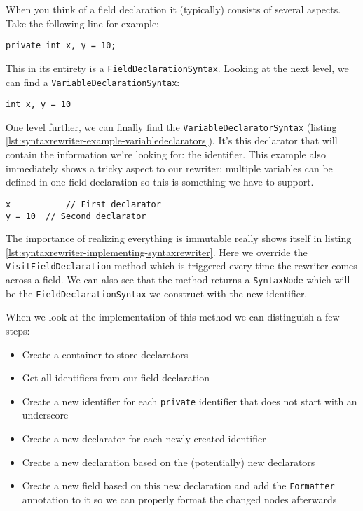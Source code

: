 When you think of a field declaration it (typically) consists of several aspects. Take the following line for example: 

\begin{lstlisting}[label={lst:syntaxrewriter-example-fielddeclaration}]
private int x, y = 10;
\end{lstlisting}

This in its entirety is a \texttt{FieldDeclarationSyntax}. Looking at the next level, we can find a \texttt{VariableDeclarationSyntax}:

\begin{lstlisting}[label={lst:syntaxrewriter-example-variabledeclaration}]
int x, y = 10
\end{lstlisting}

One level further, we can finally find the \texttt{VariableDeclaratorSyntax} (listing \ref{lst:syntaxrewriter-example-variabledeclarators}). It's this declarator that will contain the information we're looking for: the identifier. This example also immediately shows a tricky aspect to our rewriter: multiple variables can be defined in one field declaration so this is something we have to support.

\begin{lstlisting}[label={lst:syntaxrewriter-example-variabledeclarators}]
x 			// First declarator
y = 10 	// Second declarator
\end{lstlisting}

The importance of realizing everything is \gls{immutable} really shows itself in listing \ref{lst:syntaxrewriter-implementing-syntaxrewriter}. Here we override the \texttt{VisitFieldDeclaration} method which is triggered every time the rewriter comes across a field. We can also see that the method returns a \texttt{SyntaxNode} which will be the \texttt{FieldDeclarationSyntax} we construct with the new identifier.

\noindent When we look at the implementation of this method we can distinguish a few steps:

\begin{itemize}
\item Create a container to store declarators
\item Get all identifiers from our field declaration
\item Create a new identifier for each \texttt{private} identifier that does not start with an underscore
\item Create a new declarator for each newly created identifier
\item Create a new declaration based on the (potentially) new declarators
\item Create a new field based on this new declaration and add the \texttt{Formatter} annotation to it so we can properly format the changed nodes afterwards
\end{itemize}

